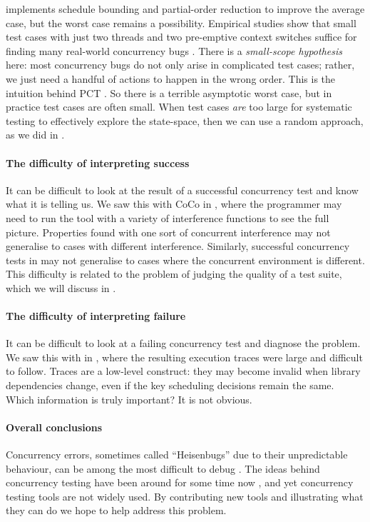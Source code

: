 \dejafu{} implements schedule
bounding \parencite{emmi2011,musuvathi2008,musuvathi2007} and partial-order
reduction \parencite{flanagan2005,godefroid1996} to improve the average
case, but the worst case remains a possibility.  Empirical studies
show that small test cases with just two threads and two pre-emptive
context switches suffice for finding many real-world concurrency
bugs \parencite{thomson2014}.  There is a \emph{small-scope hypothesis}
here: most concurrency bugs do not only arise in complicated test
cases; rather, we just need a handful of actions to happen in the
wrong order.  This is the intuition behind PCT \parencite{burckhardt2010}.
So there is a terrible asymptotic worst case, but in practice test
cases are often small.  When test cases \emph{are} too large for
systematic testing to effectively explore the state-space, then we can
use a random approach, as we did in .

\paragraph{The difficulty of interpreting success}
It can be difficult to look at the result of a successful concurrency
test and know what it is telling us.  We saw this with CoCo in
, where the programmer may need to run the tool
with a variety of interference functions to see the full picture.
Properties found with one sort of concurrent interference may not
generalise to cases with different interference.  Similarly,
successful concurrency tests in \dejafu{} may not generalise to cases
where the concurrent environment is different.  This difficulty is
related to the problem of judging the quality of a test suite, which
we will discuss in .

\paragraph{The difficulty of interpreting failure}
It can be difficult to look at a failing concurrency test and diagnose
the problem.  We saw this with \dejafu{} in
, where the resulting execution
traces were large and difficult to follow.  Traces are a low-level
construct: they may become invalid when library dependencies change,
even if the key scheduling decisions remain the same.  Which
information is truly important?  It is not obvious.

\paragraph{Overall conclusions}
Concurrency errors, sometimes called ``Heisenbugs'' due to their
unpredictable behaviour, can be among the most difficult to
debug \parencite{musuvathi2008osdi}.  The ideas behind concurrency testing
have been around for some time now \parencite{godefroid1996}, and yet
concurrency testing tools are not widely used.  By contributing new
tools and illustrating what they can do we hope to help address this
problem.
